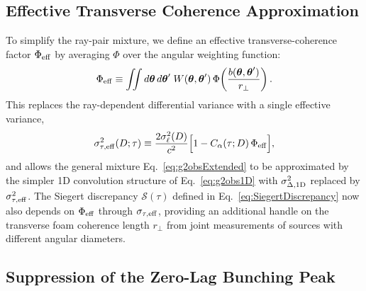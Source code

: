\documentclass[aps,prd,onecolumn,amsmath,amssymb]{revtex4-2}
\begin{document}
\subsection{Effective Transverse Coherence Approximation}

To simplify the ray-pair mixture, we define an effective transverse-coherence
factor $\Phi_{\rm eff}$ by averaging $\Phi$ over the angular weighting function:
\begin{equation}
  \Phi_{\rm eff}
  \equiv \iint d\boldsymbol{\theta}\,d\boldsymbol{\theta}'\;
         W(\boldsymbol{\theta},\boldsymbol{\theta}')\,
         \Phi\!\left(\frac{b(\boldsymbol{\theta},\boldsymbol{\theta}')}{r_\perp}\right).
  \label{eq:PhiEff}
\end{equation}
This replaces the ray-dependent differential variance with a single effective
variance,
\begin{equation}
  \sigma_{\tau,\rm eff}^2(D;\tau)
  \equiv \frac{2\sigma_\ell^2(D)}{c^2}
         \Big[1 - C_\alpha(\tau;D)\,\Phi_{\rm eff}\Big],
  \label{eq:sigmaEff}
\end{equation}
and allows the general mixture Eq.~\eqref{eq:g2obsExtended} to be approximated
by the simpler 1D convolution structure of Eq.~\eqref{eq:g2obs1D} with
$\sigma_{\Delta,{\rm 1D}}^2$ replaced by $\sigma_{\tau,\rm eff}^2$.
The Siegert discrepancy $\mathcal{S}(\tau)$ defined in
Eq.~\eqref{eq:SiegertDiscrepancy} now also depends on $\Phi_{\rm eff}$ through
$\sigma_{\tau,\rm eff}$, providing an additional handle on the transverse foam
coherence length $r_\perp$ from joint measurements of sources with different
angular diameters.

\subsection{Suppression of the Zero-Lag Bunching Peak}
\label{sec:zerolag}
\end{document}
